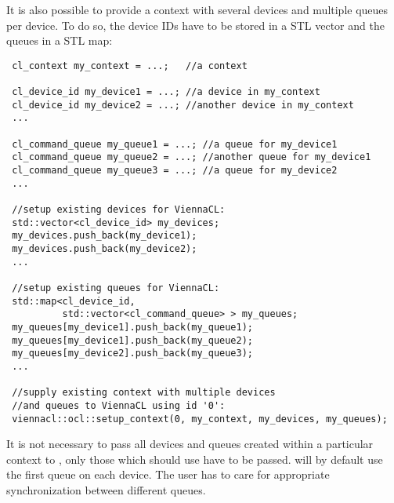 It is also possible to provide a context with several devices and multiple queues per device. To do so, the device IDs have to be stored in a STL vector
and the queues in a STL map:
\begin{lstlisting}
 cl_context my_context = ...;   //a context

 cl_device_id my_device1 = ...; //a device in my_context
 cl_device_id my_device2 = ...; //another device in my_context
 ...

 cl_command_queue my_queue1 = ...; //a queue for my_device1
 cl_command_queue my_queue2 = ...; //another queue for my_device1
 cl_command_queue my_queue3 = ...; //a queue for my_device2
 ...

 //setup existing devices for ViennaCL:
 std::vector<cl_device_id> my_devices;
 my_devices.push_back(my_device1);
 my_devices.push_back(my_device2);
 ...

 //setup existing queues for ViennaCL:
 std::map<cl_device_id,
          std::vector<cl_command_queue> > my_queues;
 my_queues[my_device1].push_back(my_queue1);
 my_queues[my_device1].push_back(my_queue2);
 my_queues[my_device2].push_back(my_queue3);
 ...

 //supply existing context with multiple devices 
 //and queues to ViennaCL using id '0':
 viennacl::ocl::setup_context(0, my_context, my_devices, my_queues);
\end{lstlisting}
It is not necessary to pass all devices and queues created within a particular context to {\ViennaCL}, only those which {\ViennaCL} should use have to be passed.
{\ViennaCL} will by default use the first queue on each device. The user has to care for appropriate synchronization between different queues.


